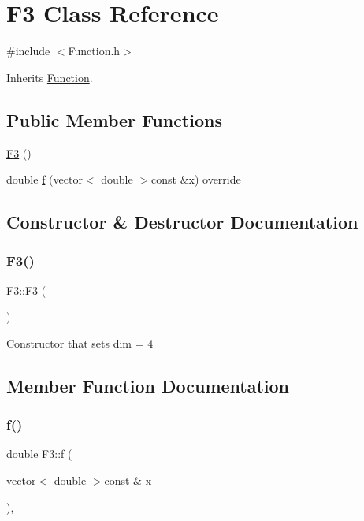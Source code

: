 \hypertarget{class_f3}{}\section{F3 Class Reference}
\label{class_f3}


{\ttfamily \#include $<$Function.\+h$>$}



Inherits \hyperlink{class_function}{Function}.

\subsection*{Public Member Functions}
\begin{DoxyCompactItemize}
\item 
\hyperlink{class_f3_aab7c365d10b83a79d9f16276ba9f22b9}{F3} ()
\item 
double \hyperlink{class_f3_ab596b20c4e2fead179df90d7946b176a}{f} (vector$<$ double $>$const \&x) override
\end{DoxyCompactItemize}


\subsection{Constructor \& Destructor Documentation}
\mbox{\label{class_f3_aab7c365d10b83a79d9f16276ba9f22b9}} 
\subsubsection{\texorpdfstring{F3()}{F3()}}
{\footnotesize\ttfamily F3\+::\+F3 (\begin{DoxyParamCaption}{ }\end{DoxyParamCaption})\hspace{0.3cm}{\ttfamily [inline]}}

Constructor that sets dim = 4 

\subsection{Member Function Documentation}
\mbox{\label{class_f3_ab596b20c4e2fead179df90d7946b176a}} 
\subsubsection{\texorpdfstring{f()}{f()}}
{\footnotesize\ttfamily double F3\+::f (\begin{DoxyParamCaption}\item[{vector$<$ double $>$const \&}]{x }\end{DoxyParamCaption})\hspace{0.3cm}{\ttfamily [override]}, {\ttfamily [virtual]}}

